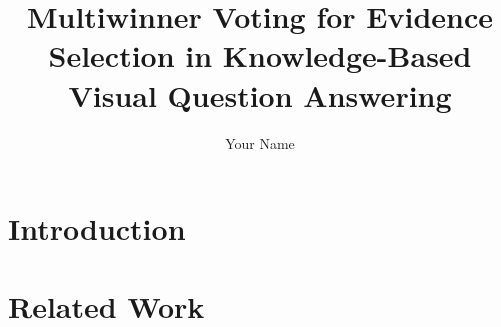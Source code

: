 \documentclass[sigconf]{aamas}
\title{Multiwinner Voting for Evidence Selection in Knowledge-Based Visual Question Answering}
\author{Your Name}
\affiliation{
  \institution{Carleton University}
  \city{Ottawa}
  \country{Canada}}
\begin{document}
\pagestyle{fancy}
\fancyhead{}

\maketitle

\section{Introduction}

%
%
%
%

\section{Related Work}

%
%
%
\end{document}

